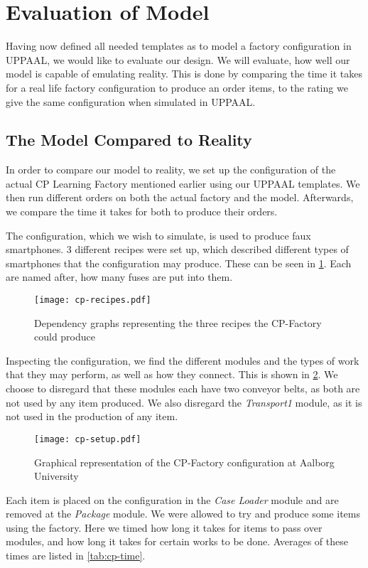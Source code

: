 \section{Evaluation of Model}
Having now defined all needed templates as to model a factory configuration in UPPAAL, we would like to evaluate our design. We will evaluate, how well our model is capable of emulating reality. This is done by comparing the time it takes for a real life factory configuration to produce an order items, to the rating we give the same configuration when simulated in UPPAAL. 

\subsection{The Model Compared to Reality} \label{ssec:realcomparison}
In order to compare our model to reality, we set up the configuration of the actual CP Learning Factory mentioned earlier using our UPPAAL templates. We then run different orders on both the actual factory and the model. Afterwards, we compare the time it takes for both to produce their orders.  

The configuration, which we wish to simulate, is used to produce faux smartphones. 3 different recipes were set up, which described different types of smartphones that the configuration may produce. These can be seen in \cref{fig:cp-recipes}. Each are named after, how many fuses are put into them.

\begin{figure}[h]
\centering
\texttt{[image: cp-recipes.pdf]}
\caption{Dependency graphs representing the three recipes the CP-Factory could produce}
\label{fig:cp-recipes}
\end{figure}

Inspecting the configuration, we find the different modules and the types of work that they may perform, as well as how they connect. This is shown in \cref{fig:cp-setup}. We choose to disregard that these modules each have two conveyor belts, as both are not used by any item produced. We also disregard the \textit{Transport1} module, as it is not used in the production of any item.

\begin{figure}[h]
\centering
\texttt{[image: cp-setup.pdf]}
\caption{Graphical representation of the CP-Factory configuration at Aalborg University}
\label{fig:cp-setup}
\end{figure}

Each item is placed on the configuration in the \textit{Case Loader} module and are removed at the \textit{Package} module. We were allowed to try and produce some items using the factory. Here we timed how long it takes for items to pass over modules, and how long it takes for certain works to be done. Averages of these times are listed in \cref{tab:cp-time}.


